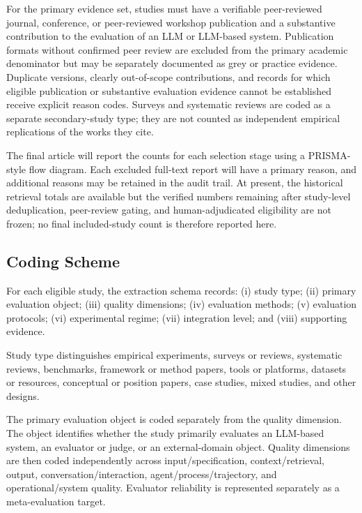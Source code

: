 For the primary evidence set, studies must have a verifiable peer-reviewed journal, conference, or peer-reviewed workshop publication and a substantive contribution to the evaluation of an LLM or LLM-based system. Publication formats without confirmed peer review are excluded from the primary academic denominator but may be separately documented as grey or practice evidence. Duplicate versions, clearly out-of-scope contributions, and records for which eligible publication or substantive evaluation evidence cannot be established receive explicit reason codes. Surveys and systematic reviews are coded as a separate secondary-study type; they are not counted as independent empirical replications of the works they cite.

The final article will report the counts for each selection stage using a PRISMA-style flow diagram. Each excluded full-text report will have a primary reason, and additional reasons may be retained in the audit trail. At present, the historical retrieval totals are available but the verified numbers remaining after study-level deduplication, peer-review gating, and human-adjudicated eligibility are not frozen; no final included-study count is therefore reported here.

\subsection{Coding Scheme}

For each eligible study, the extraction schema records: (i) study type; (ii) primary evaluation object; (iii) quality dimensions; (iv) evaluation methods; (v) evaluation protocols; (vi) experimental regime; (vii) integration level; and (viii) supporting evidence.

Study type distinguishes empirical experiments, surveys or reviews, systematic reviews, benchmarks, framework or method papers, tools or platforms, datasets or resources, conceptual or position papers, case studies, mixed studies, and other designs.

The primary evaluation object is coded separately from the quality dimension. The object identifies whether the study primarily evaluates an LLM-based system, an evaluator or judge, or an external-domain object. Quality dimensions are then coded independently across input/specification, context/retrieval, output, conversation/interaction, agent/process/trajectory, and operational/system quality. Evaluator reliability is represented separately as a meta-evaluation target.

